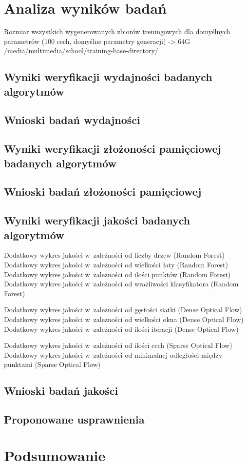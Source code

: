 \chapter{Analiza wyników badań}\label{Chapter_AnalizaRezultatow}

  Rozmiar wszystkich wygenerowanych zbiorów treningowych dla domyślnych parametrów (100 cech, domyślne parametry generacji) -> 64G /media/multimedia/school/training-base-directory/

  \section{Wyniki weryfikacji wydajności badanych algorytmów}\label{Section_Performance}

  \section{Wnioski badań wydajności}\label{Section_PerformanceWnioski}

  \section{Wyniki weryfikacji złożoności pamięciowej badanych algorytmów}\label{Section_MemoryPerformance}

  \section{Wnioski badań złożoności pamięciowej}\label{Section_MemoryPerformanceWnioski}

  \section{Wyniki weryfikacji jakości badanych algorytmów}\label{Section_Quality}

  Dodatkowy wykres jakości w~zależności od liczby drzew (Random Forest)
  Dodatkowy wykres jakości w~zależności od wielkości łaty (Random Forest)
  Dodatkowy wykres jakości w~zależności od ilości punktów (Random Forest)
  Dodatkowy wykres jakości w~zależności od wrażliwości klasyfikatora (Random Forest)

  Dodatkowy wykres jakości w~zależności od gęstości siatki (Dense Optical Flow)
  Dodatkowy wykres jakości w~zależności od wielkości okna (Dense Optical Flow)
  Dodatkowy wykres jakości w~zależności od ilości iteracji (Dense Optical Flow)

  Dodatkowy wykres jakości w~zależności od ilości cech (Sparse Optical Flow)
  Dodatkowy wykres jakości w~zależności od minimalnej odległości między punktami (Sparse Optical Flow)

  \section{Wnioski badań jakości}\label{Section_QualityWnioski}

  \section{Proponowane usprawnienia}\label{Section_Usprawnienia}

\chapter{Podsumowanie}\label{Section_Podsumowanie}